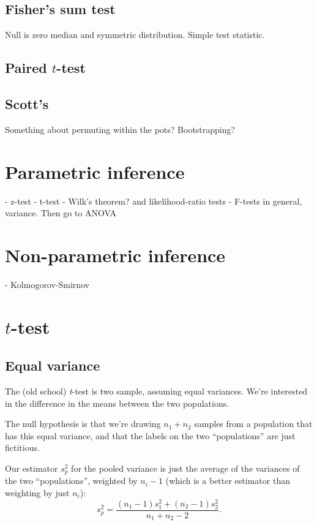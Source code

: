 \subsection{Fisher's sum test}

Null is zero median and symmetric distribution. Simple test statistic.

\subsection{Paired $t$-test}

\subsection{Scott's}

Something about permuting within the pots? Bootstrapping?

\section{Parametric inference}

- z-test
- t-test
- Wilk's theorem? and likelihood-ratio tests
- F-tests in general, variance. Then go to ANOVA

\section{Non-parametric inference}

- Kolmogorov-Smirnov

\section{$t$-test}

\subsection{Equal variance}\label{equal-variance}

The (old school) \emph{t}-test is two sample, assuming equal variances.
We're interested in the difference in the means between the two
populations.

The null hypothesis is that we're drawing \(n_1 + n_2\) samples from a
population that has this equal variance, and that the labels on the two
``populations'' are just fictitious.

Our estimator \(s_p^2\) for the pooled variance is just the average of
the variances of the two ``populations'', weighted by \(n_i - 1\) (which
is a better estimator than weighting by just \(n_i\)): \[
s_p^2 = \frac{(n_1 - 1) s_1^2 + (n_2 - 1) s_2^2}{n_1 + n_2 - 2}.
\]


